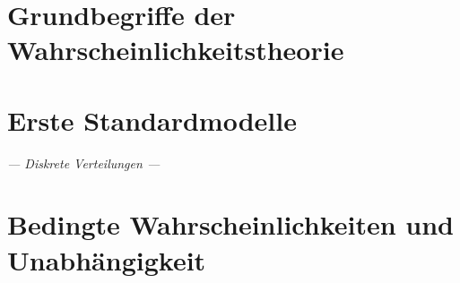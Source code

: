 \documentclass[ %
    ngerman, %
    a4paper, %
    sectionreset, %
    chapterstyle=framed, %
    sectionstyle=pure, %
    titlefont=osfamily %
]{../../texmf/tex/latex/mathscriptMathTUD/mathscriptMathTUD}
\institute{Stochastik}
\begin{document}
\MakeTitle[dark]
    
\tableofcontents

\setcounter{chapter}{-1}


\chapter{Grundbegriffe der Wahrscheinlichkeitstheorie}



\chapter{Erste Standardmodelle}
\begin{center}
    {\Large{\osfamily \itshape --- Diskrete Verteilungen ---}}
\end{center}




\chapter{Bedingte Wahrscheinlichkeiten und Unabhängigkeit}


\end{document}
